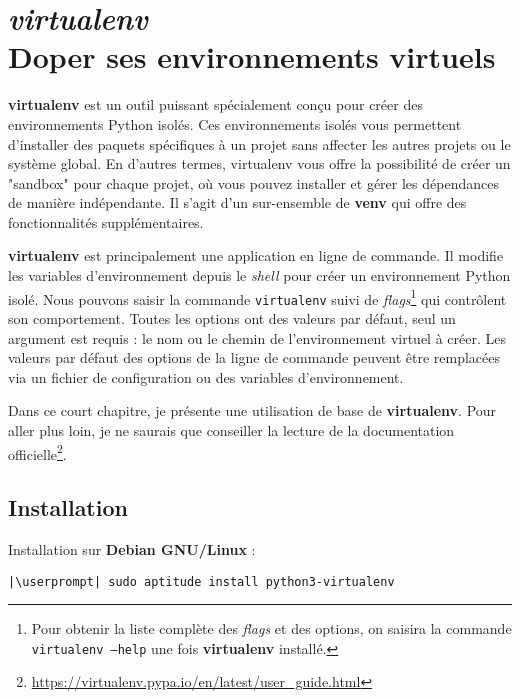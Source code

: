 \chapter[\textit{virtualenv}]{\textit{virtualenv} \\ Doper ses environnements virtuels}

\bigskip

\textbf{virtualenv} est un outil puissant spécialement conçu pour créer des environnements Python isolés. Ces environnements isolés vous permettent d'installer des paquets spécifiques à un projet sans affecter les autres projets ou le système global. En d'autres termes, virtualenv vous offre la possibilité de créer un "sandbox" pour chaque projet, où vous pouvez installer et gérer les dépendances de manière indépendante. Il s'agit d'un sur-ensemble de \textbf{venv} qui offre des fonctionnalités supplémentaires.

\textbf{virtualenv} est principalement une application en ligne de commande. Il modifie les variables d'environnement depuis le \textit{shell} pour créer un environnement Python isolé. Nous pouvons saisir la commande \texttt{virtualenv} suivi de \textit{flags}\footnote{Pour obtenir la liste complète des \textit{flags} et des options, on saisira la commande \texttt{virtualenv --help} une fois \textbf{virtualenv} installé.} qui contrôlent son comportement. Toutes les options ont des valeurs par défaut, seul un argument est requis : le nom ou le chemin de l'environnement virtuel à créer. Les valeurs par défaut des options de la ligne de commande peuvent être remplacées via un fichier de configuration ou des variables d'environnement.

Dans ce court chapitre, je présente une utilisation de base de \textbf{virtualenv}. Pour aller plus loin, je ne saurais que conseiller la lecture de la documentation officielle\footnote{\url{https://virtualenv.pypa.io/en/latest/user_guide.html}}.

\section{Installation}
Installation sur \textbf{Debian GNU/Linux} :
\begin{lstlisting}[style=bash]
|\userprompt| sudo aptitude install python3-virtualenv
\end{lstlisting}

